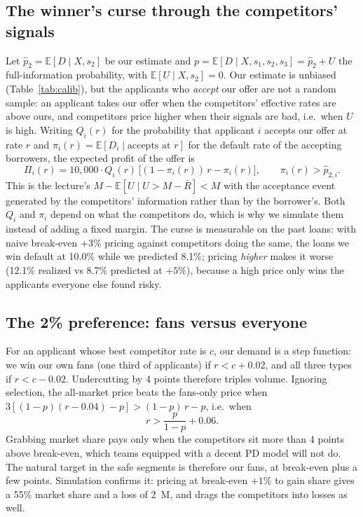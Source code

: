 \documentclass[11pt,a4paper]{article}
\newcommand{\E}{\mathbb{E}}
\newcommand{\meur}{M\texteuro}
\begin{document}
\subsection{The winner's curse through the competitors' signals}
Let $\hat p_2 = \E[D \mid X, s_2]$ be our estimate and $p = \E[D \mid X, s_1, s_2, s_3] = \hat p_2 + U$ the
full-information probability, with $\E[U \mid X, s_2] = 0$. Our estimate is unbiased (Table~\ref{tab:calib}), but
the applicants who \emph{accept} our offer are not a random sample: an applicant takes our offer when the
competitors' effective rates are above ours, and competitors price higher when their signals are bad, i.e.\ when
$U$ is high. Writing $Q_i(r)$ for the probability that applicant $i$ accepts our offer at rate $r$ and
$\pi_i(r) = \E[D_i \mid \text{accepts at } r]$ for the default rate of the accepting borrowers, the expected
profit of the offer is
\begin{equation}
  \Pi_i(r) = 10{,}000 \cdot Q_i(r)\,\big[(1-\pi_i(r))\,r - \pi_i(r)\big], \qquad \pi_i(r) > \hat p_{2,i}.
  \label{eq:profit}
\end{equation}
This is the lecture's $M - \E[U \mid U > M - \bar R] < M$ with the acceptance event generated by the competitors'
information rather than by the borrower's. Both $Q_i$ and $\pi_i$ depend on what the competitors do, which is why
we simulate them instead of adding a fixed margin. The curse is measurable on the past loans: with naive
break-even $+3\%$ pricing against competitors doing the same, the loans we win default at 10.0\% while we
predicted 8.1\%; pricing \emph{higher} makes it worse (12.1\% realized vs 8.7\% predicted at $+5\%$), because a
high price only wins the applicants everyone else found risky.

\subsection{The 2\% preference: fans versus everyone}
For an applicant whose best competitor rate is $c$, our demand is a step function: we win our own fans (one third
of applicants) if $r < c + 0.02$, and all three types if $r < c - 0.02$. Undercutting by 4 points therefore
triples volume. Ignoring selection, the all-market price beats the fans-only price when
$3[(1-p)(r-0.04) - p] > (1-p)\,r - p$, i.e.\ when
\begin{equation}
  r > \frac{p}{1-p} + 0.06 .
\end{equation}
Grabbing market share pays only when the competitors sit more than 4 points above break-even, which teams
equipped with a decent PD model will not do. The natural target in the safe segments is therefore our fans, at
break-even plus a few points. Simulation confirms it: pricing at break-even $+1\%$ to gain share gives a 55\%
market share and a loss of 2~\meur{}, and drags the competitors into losses as well.
\end{document}

